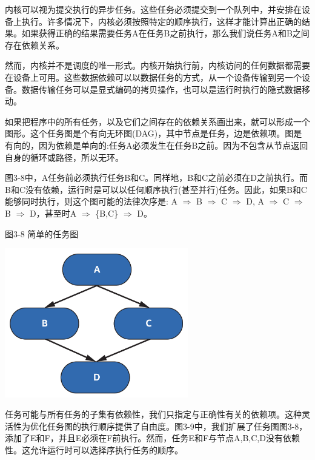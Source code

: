内核可以视为提交执行的异步任务。这些任务必须提交到一个队列中，并安排在设备上执行。许多情况下，内核必须按照特定的顺序执行，这样才能计算出正确的结果。如果获得正确的结果需要任务A在任务B之前执行，那么我们说任务A和B之间存在依赖关系。\par
 
然而，内核并不是调度的唯一形式。内核开始执行前，内核访问的任何数据都需要在设备上可用。这些数据依赖可以以数据任务的方式，从一个设备传输到另一个设备。数据传输任务可以是显式编码的拷贝操作，也可以是运行时执行的隐式数据移动。\par

如果把程序中的所有任务，以及它们之间存在的依赖关系画出来，就可以形成一个图形。这个任务图是个有向无环图(DAG)，其中节点是任务，边是依赖项。图是有向的，因为依赖是单向的:任务A必须发生在任务B之前。因为不包含从节点返回自身的循环或路径，所以无环。\par

图3-8中，A任务前必须执行任务B和C。同样地，B和C之前必须在D之前执行。而B和C没有依赖，运行时是可以以任何顺序执行(甚至并行)任务。因此，如果B和C能够同时执行，则这个图可能的法律次序是: A $\Rightarrow$ B $\Rightarrow$ C $\Rightarrow$ D, A $\Rightarrow$ C $\Rightarrow$ B $\Rightarrow$ D，甚至时A $\Rightarrow$ \{B,C\} $\Rightarrow$ D。\par

\hspace*{\fill} \par %
图3-8 简单的任务图
\begin{center}
	\includegraphics[width=0.6\textwidth]{content/chapter-3/images/4}
\end{center}

任务可能与所有任务的子集有依赖性，我们只指定与正确性有关的依赖项。这种灵活性为优化任务图的执行顺序提供了自由度。图3-9中，我们扩展了任务图图3-8，添加了E和F，并且E必须在F前执行。然而，任务E和F与节点A,B,C,D没有依赖性。这允许运行时可以选择序执行任务的顺序。\par

